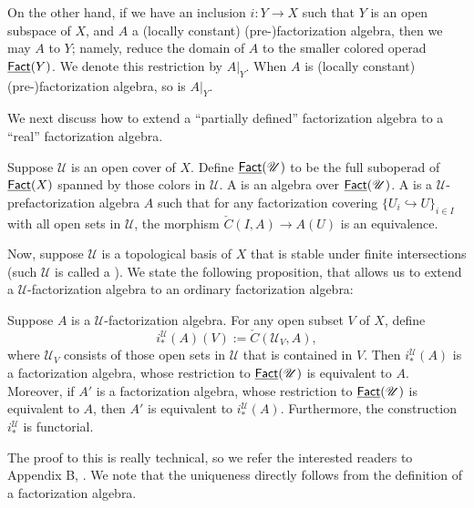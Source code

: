\documentclass[twoside]{article}
\begin{document}
On the other hand, if we have an inclusion $i:Y\to X$ such that $Y$ is an
open subspace of $X$, and $A$ a (locally constant) (pre-)factorization algebra,
then we may  $A$ to $Y$; namely, reduce the domain of $A$
to the smaller colored operad $\underline{\smash{\mathsf{Fact}}}(Y)$. We denote this restriction
by $A|_{Y}$. When $A$ is (locally constant) (pre-)factorization algebra,
so is $A|_{Y}$.

We next discuss how to extend a ``partially defined'' factorization algebra
to a ``real'' factorization algebra.

\begin{definition}
    Suppose $\mathscr U$ is an open cover of $X$. Define $\underline{\smash{\mathsf{Fact}}}(\mathscr U)$
    to be the full suboperad of $\underline{\smash{\mathsf{Fact}}}(X)$ spanned by those colors in $\mathscr U$.
    A  is an algebra over 
    $\underline{\smash{\mathsf{Fact}}}(\mathscr U)$. A 
    is a $\mathscr U$-prefactorization algebra $A$ such that for any 
    factorization covering $\{U_i\hookrightarrow U\}_{i\in I}$ with all open sets
    in $\mathscr U$, the morphism $\check{C}(I,A)\to A(U)$ is an equivalence.
\end{definition}

Now, suppose $\mathscr U$ is a topological basis of $X$ that is stable
under finite intersections (such $\mathscr U$ is called a 
). We state the following proposition, that allows us
to extend a $\mathscr U$-factorization algebra to an ordinary
factorization algebra:

\begin{proposition}\label{c}
    Suppose $A$ is a $\mathscr U$-factorization algebra. For any open subset $V$
    of $X$, define $$i_*^{\mathscr U}(A)(V):=\check{C}({\mathscr U}_V,A),$$
    where ${\mathscr U}_V$ consists of those open sets in ${\mathscr U}$ that is
    contained in $V$. Then $i_*^{\mathscr U}(A)$ is a factorization algebra,
    whose restriction to $\underline{\smash{\mathsf{Fact}}}(\mathscr U)$ is equivalent to $A$. Moreover,
    if $A'$ is a factorization algebra, whose restriction to $\underline{\smash{\mathsf{Fact}}}(\mathscr U)$
    is equivalent to $A$, then $A'$ is equivalent to $i_*^{\mathscr U}(A)$.
    Furthermore, the construction $i_*^{\mathscr U}$ is functorial.
\end{proposition}

The proof to this is really technical, so we refer the interested readers to Appendix B, \cite{CG16}.
We note that the uniqueness directly follows from
the definition of a factorization algebra.
\end{document}
